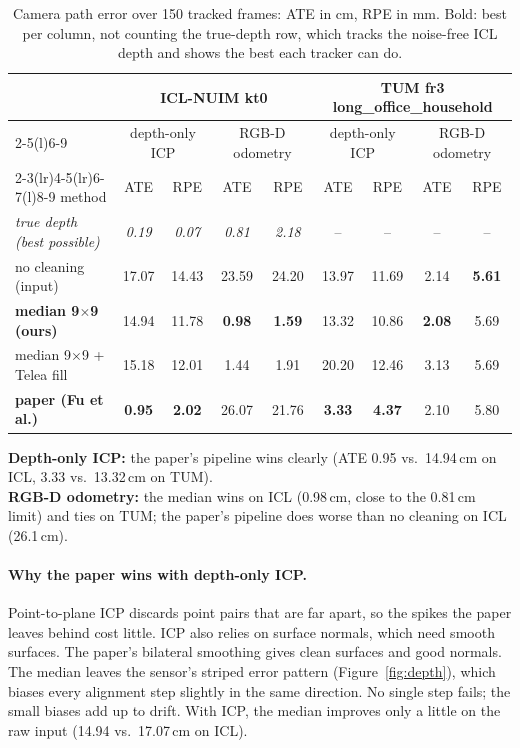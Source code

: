 \documentclass[11pt,a4paper]{article}
\newcommand{\best}[1]{\textbf{#1}}
\newcommand{\cm}{\,cm\xspace}
\begin{document}
\begin{table}[h]
\centering\small
\setlength{\tabcolsep}{5pt}
\begin{tabular}{@{}lcccccccc@{}}
\toprule
 & \multicolumn{4}{c}{ICL-NUIM kt0} & \multicolumn{4}{c}{TUM fr3 long\_office\_household} \\
\cmidrule(lr){2-5}\cmidrule(l){6-9}
 & \multicolumn{2}{c}{depth-only ICP} & \multicolumn{2}{c}{RGB-D odometry} & \multicolumn{2}{c}{depth-only ICP} & \multicolumn{2}{c}{RGB-D odometry} \\
\cmidrule(lr){2-3}\cmidrule(lr){4-5}\cmidrule(lr){6-7}\cmidrule(l){8-9}
method & ATE & RPE & ATE & RPE & ATE & RPE & ATE & RPE \\
\midrule
\textit{true depth (best possible)} & \textit{0.19} & \textit{0.07} & \textit{0.81} & \textit{2.18} & -- & -- & -- & -- \\
no cleaning (input)            & 17.07 & 14.43 & 23.59 & 24.20 & 13.97 & 11.69 & 2.14 & \best{5.61} \\
\textcolor{ours}{\textbf{median 9$\times$9 (ours)}} & 14.94 & 11.78 & \best{0.98} & \best{1.59} & 13.32 & 10.86 & \best{2.08} & 5.69 \\
median 9$\times$9 + Telea fill & 15.18 & 12.01 & 1.44 & 1.91 & 20.20 & 12.46 & 3.13 & 5.69 \\
\textcolor{paper}{\textbf{paper (Fu et al.)}} & \best{0.95} & \best{2.02} & 26.07 & 21.76 & \best{3.33} & \best{4.37} & 2.10 & 5.80 \\
\bottomrule
\end{tabular}
\caption{Camera path error over 150 tracked frames: ATE in cm, RPE in mm. Bold: best per column, not counting the
true-depth row, which tracks the noise-free ICL depth and shows the best each tracker can do.}
\label{tab:tracking}
\end{table}

\begin{keybox}[title=The result flips with the tracker]
\textbf{Depth-only ICP:} the paper's pipeline wins clearly (ATE 0.95 vs.\ 14.94\cm on ICL, 3.33 vs.\ 13.32\cm on TUM).\\
\textbf{RGB-D odometry:} the median wins on ICL (0.98\cm, close to the 0.81\cm limit) and ties on TUM;
the paper's pipeline does worse than no cleaning on ICL (26.1\cm).
\end{keybox}

\paragraph{Why the paper wins with depth-only ICP.}
Point-to-plane ICP discards point pairs that are far apart, so the spikes the paper leaves behind cost little. ICP also
relies on surface normals, which need smooth surfaces. The paper's bilateral smoothing gives clean surfaces and
good normals. The median leaves the sensor's striped error pattern (Figure~\ref{fig:depth}), which biases every
alignment step slightly in the same direction. No single step fails; the small biases add up to drift. With ICP, the median
improves only a little on the raw input (14.94 vs.\ 17.07\cm on ICL).
\end{document}
